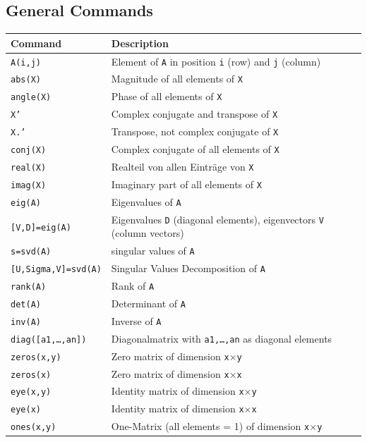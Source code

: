 \documentclass[a4paper,12 pt]{article}
\numberwithin{equation}{section}
\theoremstyle{definition}
\theoremstyle{remark}
\theoremstyle{definition}
\theoremstyle{definition}
\theoremstyle{definition}
\theoremstyle{remark}
\begin{document}
\subsection{General Commands}
\begin{center}\begin{tabular}{ll}
\toprule
Command & Description \\
\midrule
\texttt{A(i,j)} & Element of \texttt{A} in position \texttt{i} (row) and \texttt{j} (column) \\
\texttt{abs(X)} & Magnitude of all elements of \texttt{X} \\
\texttt{angle(X)} & Phase of all elements of \texttt{X} \\
\texttt{X'} & Complex conjugate and transpose of \texttt{X} \\
\texttt{X.'} & Transpose, not complex conjugate of \texttt{X} \\
\texttt{conj(X)} & Complex conjugate of all elements of \texttt{X}\\
\texttt{real(X)} & Realteil von allen Eintr\"age von \texttt{X}\\
\texttt{imag(X)} & Imaginary part of all elements of \texttt{X}\\
\texttt{eig(A)} & Eigenvalues of \texttt{A} \\ 
\texttt{[V,D]=eig(A)} & Eigenvalues \texttt{D} (diagonal elements), eigenvectors \texttt{V} (column vectors) \\
\texttt{s=svd(A)} & singular values of \texttt{A} \\
\texttt{[U,Sigma,V]=svd(A)} & Singular Values Decomposition of \texttt{A} \\
\texttt{rank(A)} & Rank of \texttt{A} \\
\texttt{det(A)} & Determinant of \texttt{A} \\
\texttt{inv(A)} & Inverse of \texttt{A} \\
\texttt{diag([a1,\ldots,an])} & Diagonalmatrix with \texttt{a1,\ldots,an} as diagonal elements\\
\texttt{zeros(x,y)} & Zero matrix of dimension \texttt{x}$\times$\texttt{y} \\
\texttt{zeros(x)} & Zero matrix of dimension \texttt{x}$\times$\texttt{x} \\
\texttt{eye(x,y)} & Identity matrix of dimension \texttt{x}$\times$\texttt{y} \\
\texttt{eye(x)} & Identity matrix of dimension \texttt{x}$\times$\texttt{x} \\
\texttt{ones(x,y)} & One-Matrix (all elements = 1) of dimension \texttt{x}$\times$\texttt{y} \\

\end{tabular}
\end{center}
\end{document}
